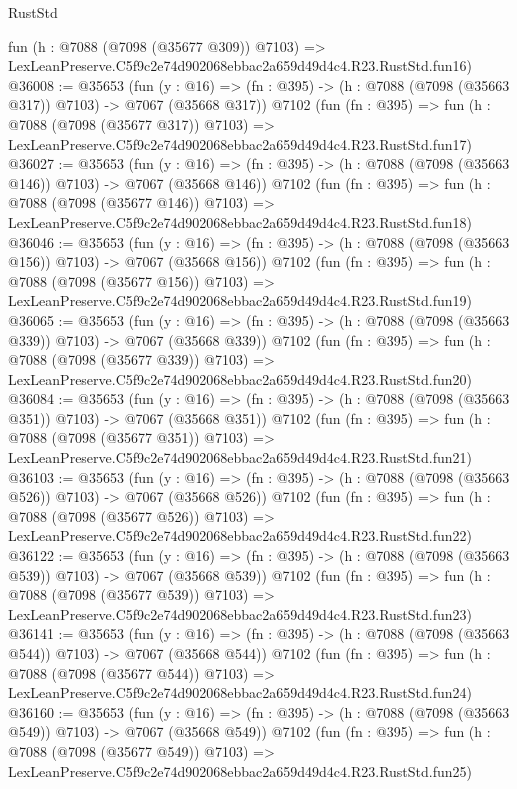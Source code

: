\begin{lexlean}{RustStd}
\begin{coremodule}
    fun (h : @7088 (@7098 (@35677 @309)) @7103) =>
    LexLeanPreserve.C5f9c2e74d902068ebbac2a659d49d4c4.R23.RustStd.fun16)
@36008 := @35653
    (fun (y : @16) => (fn : @395) -> (h : @7088 (@7098 (@35663 @317)) @7103) -> @7067 (@35668 @317))
    @7102
    (fun (fn : @395) =>
    fun (h : @7088 (@7098 (@35677 @317)) @7103) =>
    LexLeanPreserve.C5f9c2e74d902068ebbac2a659d49d4c4.R23.RustStd.fun17)
@36027 := @35653
    (fun (y : @16) => (fn : @395) -> (h : @7088 (@7098 (@35663 @146)) @7103) -> @7067 (@35668 @146))
    @7102
    (fun (fn : @395) =>
    fun (h : @7088 (@7098 (@35677 @146)) @7103) =>
    LexLeanPreserve.C5f9c2e74d902068ebbac2a659d49d4c4.R23.RustStd.fun18)
@36046 := @35653
    (fun (y : @16) => (fn : @395) -> (h : @7088 (@7098 (@35663 @156)) @7103) -> @7067 (@35668 @156))
    @7102
    (fun (fn : @395) =>
    fun (h : @7088 (@7098 (@35677 @156)) @7103) =>
    LexLeanPreserve.C5f9c2e74d902068ebbac2a659d49d4c4.R23.RustStd.fun19)
@36065 := @35653
    (fun (y : @16) => (fn : @395) -> (h : @7088 (@7098 (@35663 @339)) @7103) -> @7067 (@35668 @339))
    @7102
    (fun (fn : @395) =>
    fun (h : @7088 (@7098 (@35677 @339)) @7103) =>
    LexLeanPreserve.C5f9c2e74d902068ebbac2a659d49d4c4.R23.RustStd.fun20)
@36084 := @35653
    (fun (y : @16) => (fn : @395) -> (h : @7088 (@7098 (@35663 @351)) @7103) -> @7067 (@35668 @351))
    @7102
    (fun (fn : @395) =>
    fun (h : @7088 (@7098 (@35677 @351)) @7103) =>
    LexLeanPreserve.C5f9c2e74d902068ebbac2a659d49d4c4.R23.RustStd.fun21)
@36103 := @35653
    (fun (y : @16) => (fn : @395) -> (h : @7088 (@7098 (@35663 @526)) @7103) -> @7067 (@35668 @526))
    @7102
    (fun (fn : @395) =>
    fun (h : @7088 (@7098 (@35677 @526)) @7103) =>
    LexLeanPreserve.C5f9c2e74d902068ebbac2a659d49d4c4.R23.RustStd.fun22)
@36122 := @35653
    (fun (y : @16) => (fn : @395) -> (h : @7088 (@7098 (@35663 @539)) @7103) -> @7067 (@35668 @539))
    @7102
    (fun (fn : @395) =>
    fun (h : @7088 (@7098 (@35677 @539)) @7103) =>
    LexLeanPreserve.C5f9c2e74d902068ebbac2a659d49d4c4.R23.RustStd.fun23)
@36141 := @35653
    (fun (y : @16) => (fn : @395) -> (h : @7088 (@7098 (@35663 @544)) @7103) -> @7067 (@35668 @544))
    @7102
    (fun (fn : @395) =>
    fun (h : @7088 (@7098 (@35677 @544)) @7103) =>
    LexLeanPreserve.C5f9c2e74d902068ebbac2a659d49d4c4.R23.RustStd.fun24)
@36160 := @35653
    (fun (y : @16) => (fn : @395) -> (h : @7088 (@7098 (@35663 @549)) @7103) -> @7067 (@35668 @549))
    @7102
    (fun (fn : @395) =>
    fun (h : @7088 (@7098 (@35677 @549)) @7103) =>
    LexLeanPreserve.C5f9c2e74d902068ebbac2a659d49d4c4.R23.RustStd.fun25)

\end{coremodule}
\end{lexlean}
